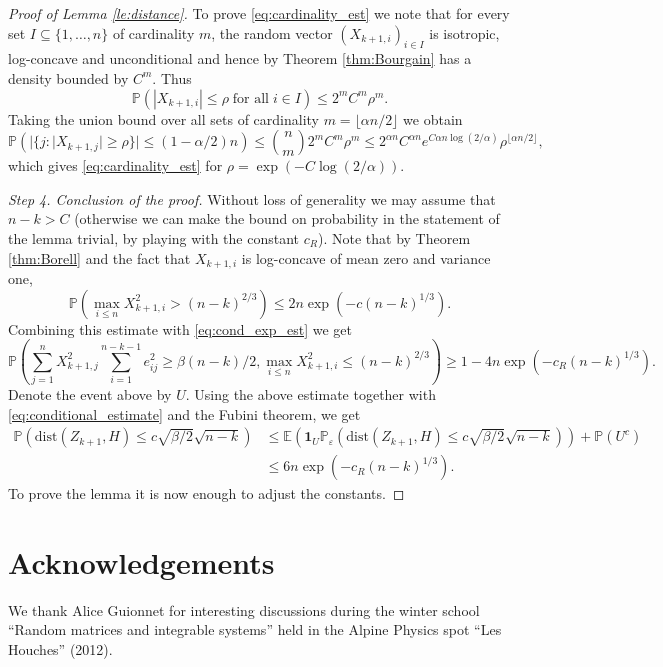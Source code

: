 \documentclass[12pt,reqno]{amsart}
\begin{document}
\begin{proof}[Proof of Lemma \ref{le:distance}]
To prove \eqref{eq:cardinality_est} we note that for every set $I\subseteq
\{1,\ldots,n\}$ of cardinality $m$, the random vector $(X_{k+1,i})_{i\in I}$
is isotropic, log-concave and unconditional and hence by Theorem
\ref{thm:Bourgain} has a density bounded by $C^m$. Thus
\[
{\mathbb{P}}(|X_{k+1,i}|\le \rho \;\textrm{for all}\; i\in I) \le 2^mC^m\rho^m.
\]
Taking the union bound over all sets of cardinality $m= \lfloor \alpha
n/2\rfloor $ we obtain
\[
{\mathbb{P}}(|\{j\colon |X_{k+1,j}| \ge \rho\}| \le (1-\alpha/2)n) \le \binom{n}{m}2^m C^m\rho^m \le2^{\alpha n} C^{\alpha n} e^{C\alpha n\log(2/\alpha)}\rho^{\lfloor \alpha n/2\rfloor},
\]
which gives \eqref{eq:cardinality_est} for $\rho = \exp(-C\log(2/\alpha))$.

\medskip
\noindent\textit{Step 4. Conclusion of the proof.}
Without loss of generality we may assume that $n-k > C$ (otherwise we can make
the bound on probability in the statement of the lemma trivial, by playing
with the constant $c_R$). Note that by Theorem \ref{thm:Borell} and the fact
that $X_{k+1,i}$ is log-concave of mean zero and variance one,
\[
{\mathbb{P}}(\max_{i\le n} X_{k+1,i}^2 > (n-k)^{2/3}) \le 2n\exp(-c(n-k)^{1/3}).
\]
Combining this estimate with \eqref{eq:cond_exp_est} we get
\[
{\mathbb{P}}\left(\sum_{j=1}^nX_{k+1,j}^2\sum_{i=1}^{n-k-1}e_{ij}^2   \ge \beta (n-k)/2, \max_{i\le n} X_{k+1,i}^2   \le (n-k)^{2/3}\right) \ge 1 -4n\exp(-c_R (n-k)^{1/3}).
\]
Denote the event above by $U$. Using the above estimate together with
\eqref{eq:conditional_estimate} and the Fubini theorem, we get
\begin{align*}
  {\mathbb{P}}({\mathrm{dist}}(Z_{k+1},H) \le c\sqrt{\beta/2}\sqrt{n-k})
  &\le {\mathbb{E}}\left({\mathbf{1}_{{U}}}{\mathbb{P}}_\varepsilon({\mathrm{dist}}(Z_{k+1},H)\le c\sqrt{\beta/2}\sqrt{n-k})\right) + {\mathbb{P}}(U^c)\\
  &\le 6n\exp(-c_R(n-k)^{1/3}).
\end{align*}
To prove the lemma it is now enough to adjust the constants.
\end{proof}




\section*{Acknowledgements}

We thank Alice Guionnet for interesting discussions during the winter school
``Random matrices and integrable systems'' held in the Alpine Physics spot
``Les Houches'' (2012).
\end{document}

